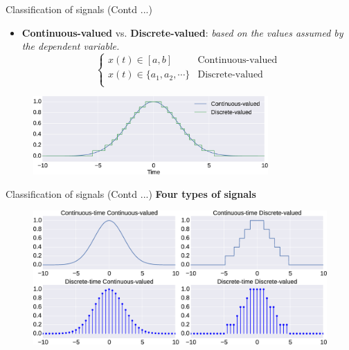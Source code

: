 \documentclass{beamer}
\begin{document}
\begin{frame}{Classification of signals (Contd ...)}
\begin{itemize}
\item \textbf{Continuous-valued} vs. \textbf{Discrete-valued}: \textit{based on the values assumed by the dependent variable.}
\[
\begin{cases}
x(t) \in [a, b] & \text{Continuous-valued} \\
x(t) \in \{a_1, a_2, \cdots\} & \text{Discrete-valued} \\
\end{cases}
 \]
\end{itemize}
\begin{figure}
\includegraphics[width=0.8\textwidth]{img/cont_disc_val.eps}
\end{figure}
\end{frame}

\begin{frame}{Classification of signals (Contd ...)}
\textbf{Four types of signals}
\begin{figure}
\includegraphics[width=\textwidth]{img/signal_types.eps}
\end{figure}
\end{frame}
\end{document}
